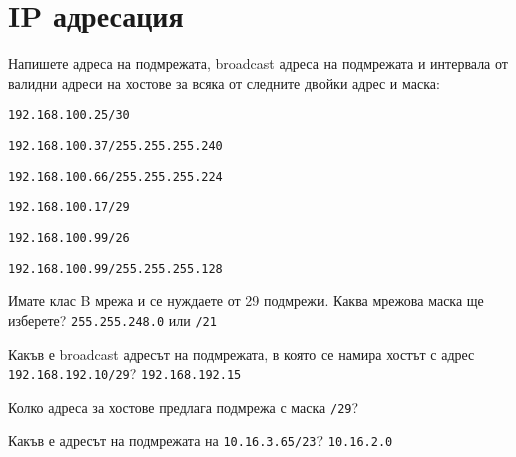 \section{IP адресация}
\begin{q}
  Напишете адреса на подмрежата, broadcast адреса на подмрежата и интервала от
  валидни адреси на хостове за всяка от следните двойки адрес и маска:
  \begin{defractors}
  \item \texttt{192.168.100.25/30}
  \item \texttt{192.168.100.37/255.255.255.240}
  \item \texttt{192.168.100.66/255.255.255.224}
  \item \texttt{192.168.100.17/29}
  \item \texttt{192.168.100.99/26}
  \item \texttt{192.168.100.99/255.255.255.128}
  \end{defractors}
\end{q}

\begin{q}
  Имате клас B мрежа и се нуждаете от 29 подмрежи. Каква мрежова маска ще
  изберете? \rans \texttt{255.255.248.0} или \texttt{/21}
\end{q}

\begin{q}
  Какъв е broadcast адресът на подмрежата, в която се намира хостът с адрес
  \texttt{192.168.192.10/29}? \rans \texttt{192.168.192.15}
\end{q}

\begin{q}
  Колко адреса за хостове предлага подмрежа с маска \texttt{/29}? 
\end{q}

\begin{q}
  Какъв е адресът на подмрежата на \texttt{10.16.3.65/23}? \rans
  \texttt{10.16.2.0}
\end{q}


